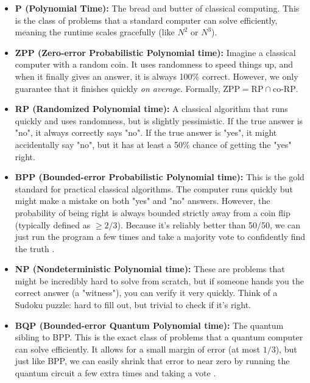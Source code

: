 \begin{itemize}
    \item \textbf{P (Polynomial Time):} 
    The bread and butter of classical computing. 
    This is the class of problems that a standard computer can solve efficiently, meaning the runtime scales gracefully (like $N^2$ or $N^3$).

    \item \textbf{ZPP (Zero-error Probabilistic Polynomial time):} 
    Imagine a classical computer with a random coin. 
    It uses randomness to speed things up, and when it finally gives an answer, it is always 100\% correct. 
    However, we only guarantee that it finishes quickly \textit{on average}. 
    Formally, $\text{ZPP} = \text{RP} \cap \text{co-RP}$.

    \item \textbf{RP (Randomized Polynomial time):} 
    A classical algorithm that runs quickly and uses randomness, but is slightly pessimistic. 
    If the true answer is "no", it always correctly says "no". 
    If the true answer is "yes", it might accidentally say "no", but it has at least a 50\% chance of getting the "yes" right.

    \item \textbf{BPP (Bounded-error Probabilistic Polynomial time):} 
    This is the gold standard for practical classical algorithms. 
    The computer runs quickly but might make a mistake on both "yes" and "no" answers. 
    However, the probability of being right is always bounded strictly away from a coin flip (typically defined as $\geq 2/3$). 
    Because it's reliably better than 50/50, we can just run the program a few times and take a majority vote to confidently find the truth \cite{arora2009computational}.

    \item \textbf{NP (Nondeterministic Polynomial time):} 
    These are problems that might be incredibly hard to solve from scratch, but if someone hands you the correct answer (a "witness"), you can verify it very quickly. 
    Think of a Sudoku puzzle: hard to fill out, but trivial to check if it's right.

    \item \textbf{BQP (Bounded-error Quantum Polynomial time):} 
    The quantum sibling to BPP. 
    This is the exact class of problems that a quantum computer can solve efficiently. 
    It allows for a small margin of error (at most $1/3$), but just like BPP, we can easily shrink that error to near zero by running the quantum circuit a few extra times and taking a vote \cite{bernstein1997, nielsen2010quantum}.


\end{itemize}
